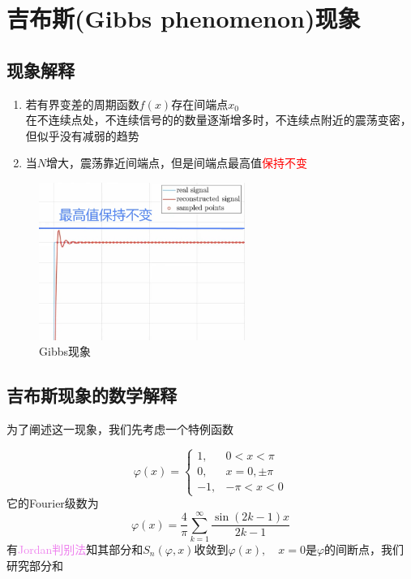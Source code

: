 \documentclass{lzureport}
\begin{document}

\newpage
\section{吉布斯(Gibbs phenomenon)现象}
\label{sec:吉布斯现象}
\subsection{现象解释}
\label{subsec:吉布斯现象解释}
\begin{enumerate}[label=\arabic*)]
	\item 若有界变差的周期函数$f(x)$存在间端点$x_0$\\
	在不连续点处，不连续信号的的数量逐渐增多时，不连续点附近的震荡变密，但似乎没有减弱的趋势
	\item 当$N$增大，震荡靠近间端点，但是间端点最高值\textcolor{red}{保持不变}
\end{enumerate}

\begin{figure}[htbp]%
	\centering %
	\includegraphics[width=0.6\textwidth]{figure/Gibbs现象.png}
	\caption{\label{fig:Gibbs现象}Gibbs现象}
\end{figure}

\subsection{吉布斯现象的数学解释}
\label{subsec:吉布斯现象的数学解释}
为了阐述这一现象，我们先考虑一个特例函数

$$
\varphi(x) =\left\{\begin{matrix}
	1,&0<x<\pi \\
	0,&x=0,\pm\pi \\
	-1,&-\pi<x<0
	\end{matrix}\right.
$$
 它的Fourier级数为
$$
\varphi(x) =\frac{4}{\pi}\sum_{k=1}^{\infty}\frac{\sin{(2k-1)x}}{2k-1} 
$$
有\textcolor{violet}{Jordan判别法}知其部分和$S_n(\varphi,x)$收敛到$\varphi(x),\quad x=0$是$\varphi$的间断点，我们研究部分和
\end{document}
